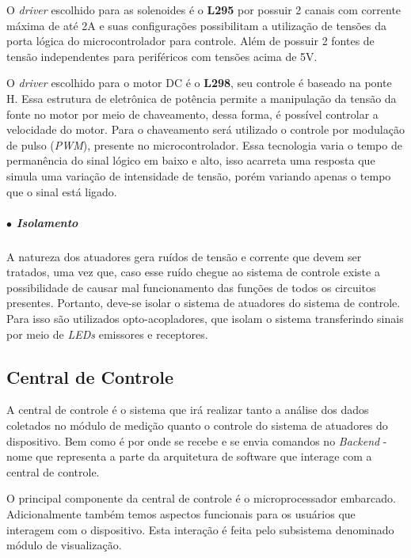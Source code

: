     O \textit{driver} escolhido para as solenoides é o \textbf{L295} por possuir 2 canais com corrente máxima de até 2A e suas configurações possibilitam a utilização de tensões da porta lógica do microcontrolador para controle. Além de possuir 2 fontes de tensão independentes para periféricos com tensões acima de 5V.
    
    O \textit{driver} escolhido para o motor DC é o \textbf{L298}, seu controle é baseado na ponte H. Essa estrutura de eletrônica de potência permite a manipulação da tensão da fonte no motor por meio de chaveamento, dessa forma, é possível controlar a velocidade do motor. Para o chaveamento será utilizado o controle por modulação de pulso (\textit{PWM}), presente no microcontrolador. Essa tecnologia varia o tempo de permanência do sinal lógico em baixo e alto, isso acarreta uma resposta que simula uma variação de intensidade de tensão, porém variando apenas o tempo que o sinal está ligado.  
    
    
    \subparagraph*{$\bullet$ Isolamento} \hfill
    
    A natureza dos atuadores gera ruídos de tensão e corrente que devem ser tratados, uma vez que, caso esse ruído chegue ao sistema de controle existe a possibilidade de causar mal funcionamento das funções de todos os circuitos presentes. Portanto, deve-se isolar o sistema de atuadores do sistema de controle. Para isso são utilizados opto-acopladores, que isolam o sistema transferindo sinais por meio de \textit{LEDs} emissores e receptores.
    

\subsection{Central de Controle}

A central de controle é o sistema que irá realizar tanto a análise dos dados coletados no módulo de medição quanto o controle do sistema de atuadores do dispositivo. Bem como é por onde se recebe e se envia comandos no \textit{Backend} - nome que representa a parte da arquitetura de software que interage com a central de controle. 

O principal componente da central de controle é o microprocessador embarcado. Adicionalmente também temos aspectos funcionais para os usuários que interagem com o dispositivo. Esta interação é feita pelo subsistema denominado módulo de visualização.

